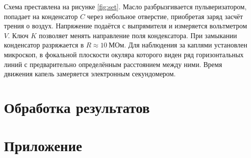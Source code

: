 \documentclass[a4paper, 12pt]{article}
\begin{document}
Схема преставлена на рисунке \ref{fig:set}. Масло разбрызгивается пульверизатором, попадает на конденсатор $C$ через небольное отверстие, приобретая заряд засчёт трения о воздух.
Напряжение подаётся с выпрямителя и измеряется вольтметром $V$. Ключ $K$ позволяет менять направление поля кондексатора. При замыкании конденсатор разряжается в $R \approx 10~\text{МОм}$.
Для наблюдения за каплями установлен микроскоп, в фокальной плоскости окуляра которого  виден ряд горизонтальных линий с предварительно определённым расстоянием между ними. Время движения капель замеряется электронным секундомером.



\section{Обработка результатов}



\section{Приложение}
\end{document}
